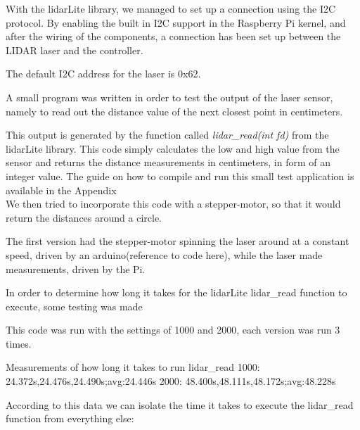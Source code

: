 With the lidarLite library, we managed to set up a connection using the I2C protocol. By enabling the built in I2C support in the Raspberry Pi kernel, and after the wiring of the components, a connection has been set up between the LIDAR laser and the controller.

The default I2C address for the laser is 0x62.


A small program was written in order to test the output of the laser sensor, namely to read out the distance value of the next closest point in centimeters. 


This output is generated by the function called \textit{lidar\_read(int fd)} from the lidarLite library. This code simply calculates the low and high value from the sensor and returns the distance measurements in centimeters, in form of an integer value. The guide on how to compile and run this small test application is available in the Appendix \\ 



We then tried to incorporate this code with a stepper-motor, so that it would return the distances around a circle.

The first version had the stepper-motor spinning the laser around at a constant speed, driven by an arduino(reference to code here), while the laser made measurements, driven by the Pi.

In order to determine how long it takes for the lidarLite lidar\_read function to execute, some testing was made


This code was run with the settings of 1000 and 2000, each version was run 3 times.

Measurements of how long it takes to run lidar\_read
1000: 24.372s,24.476s,24.490s;avg:24.446s
2000: 48.400s,48.111s,48.172s;avg:48.228s

According to this data we can isolate the time it takes to execute the lidar\_read function from everything else:

